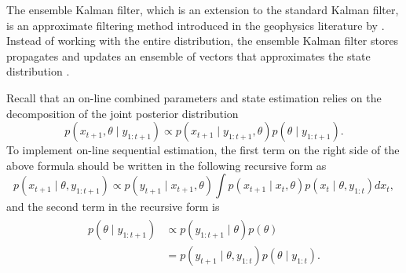 The ensemble Kalman filter, which is an extension to the standard Kalman filter, is an approximate filtering method introduced in the geophysics literature by \cite{evensen1994sequential}. Instead of working with the entire distribution, the ensemble Kalman filter stores propagates and updates an ensemble of vectors that approximates the state distribution \citep{katzfuss2016understanding}. 


Recall that an on-line combined parameters and state estimation relies on the decomposition of the joint posterior distribution 
\begin{equation*}\label{jointposterior}
p(x_{t+1},\theta \mid y_{1:t+1}) \propto p(x_{t+1}\mid y_{1:t+1},\theta)p(\theta\mid y_{1:t+1}).
\end{equation*}
To implement on-line sequential estimation, the first term on the right side of the above formula should be written in the following recursive form as 
\begin{equation}\label{jointposteriorterm1}
p(x_{t+1}\mid \theta, y_{1:t+1}) \propto p(y_{t+1}\mid x_{t+1},\theta) \int p(x_{t+1}\mid x_{t},\theta) p(x_{t}\mid \theta, y_{1:t})dx_{t},
\end{equation}
and the second term in the recursive form is 
\begin{align}\label{jointposteriorterm2}
\begin{split}
p(\theta\mid y_{1:t+1}) & \propto p( y_{1:t+1}\mid\theta)p(\theta) \\
&= p(y_{t+1}\mid\theta,y_{1:t})p(\theta\mid y_{1:t}).
\end{split}
\end{align}


